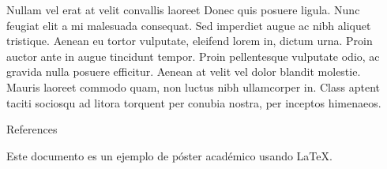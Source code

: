 \documentclass[final]{beamer}
\newlength{\sepwidth}
\newlength{\colwidth}
\newcommand{\separatorcolumn}{\begin{column}{\sepwidth}\end{column}}
\begin{document}
\begin{frame}[t]
\begin{columns}[t]
\begin{column}{\colwidth}
\begin{block}{Nullam vel erat at velit convallis laoreet}
    Donec quis posuere ligula. Nunc feugiat elit a mi malesuada consequat. Sed
    imperdiet augue ac nibh aliquet tristique. Aenean eu tortor vulputate,
    eleifend lorem in, dictum urna. Proin auctor ante in augue tincidunt
    tempor. Proin pellentesque vulputate odio, ac gravida nulla posuere
    efficitur. Aenean at velit vel dolor blandit molestie. Mauris laoreet
    commodo quam, non luctus nibh ullamcorper in. Class aptent taciti sociosqu
    ad litora torquent per conubia nostra, per inceptos himenaeos.



  \end{block}

  \begin{block}{References}

    Este documento es un ejemplo de póster académico usando LaTeX.

  \end{block}

\end{column}

\separatorcolumn
\end{columns}
\end{frame}
\end{document}
